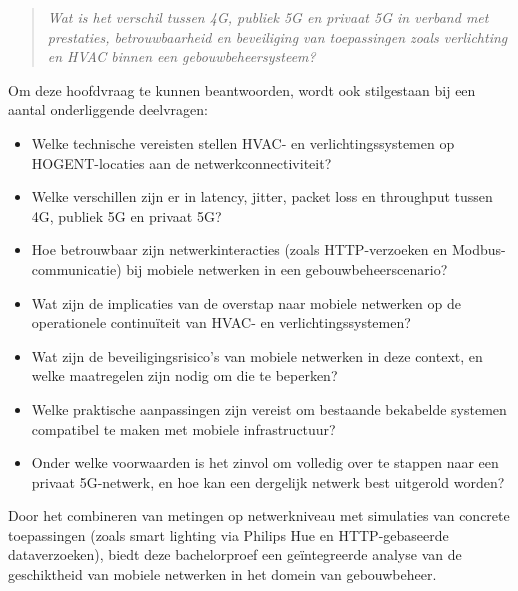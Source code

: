 \begin{quote}
    \textit{Wat is het verschil tussen 4G, publiek 5G en privaat 5G in verband met prestaties, betrouwbaarheid en beveiliging van toepassingen zoals verlichting en HVAC binnen een gebouwbeheersysteem?}
\end{quote}

Om deze hoofdvraag te kunnen beantwoorden, wordt ook stilgestaan bij een aantal onderliggende deelvragen:

\begin{itemize}
    \item Welke technische vereisten stellen HVAC- en verlichtingssystemen op HOGENT-locaties aan de netwerkconnectiviteit?
    \item Welke verschillen zijn er in latency, jitter, packet loss en throughput tussen 4G, publiek 5G en privaat 5G?
    \item Hoe betrouwbaar zijn netwerkinteracties (zoals HTTP-verzoeken en Modbus-communicatie) bij mobiele netwerken in een gebouwbeheerscenario?
    \item Wat zijn de implicaties van de overstap naar mobiele netwerken op de operationele continuïteit van HVAC- en verlichtingssystemen?
    \item Wat zijn de beveiligingsrisico’s van mobiele netwerken in deze context, en welke maatregelen zijn nodig om die te beperken?
    \item Welke praktische aanpassingen zijn vereist om bestaande bekabelde systemen compatibel te maken met mobiele infrastructuur?
    \item Onder welke voorwaarden is het zinvol om volledig over te stappen naar een privaat 5G-netwerk, en hoe kan een dergelijk netwerk best uitgerold worden?
\end{itemize}

Door het combineren van metingen op netwerkniveau met simulaties van concrete toepassingen (zoals smart lighting via Philips Hue en HTTP-gebaseerde dataverzoeken), biedt deze bachelorproef een geïntegreerde analyse van de geschiktheid van mobiele netwerken in het domein van gebouwbeheer.

